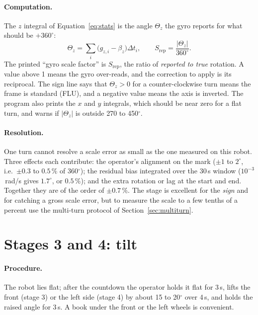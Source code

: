 \documentclass[11pt,a4paper]{report}
\begin{document}
\paragraph{Computation.} The $z$ integral of Equation~\eqref{eq:stats} is the angle $\Theta_z$ the gyro reports for what should be $+360^\circ$:
\begin{equation}
  \Theta_z=\sum_i\bigl(g_{z,i}-\beta_z\bigr)\Delta t_i,\qquad S_{\mathrm{rep}}=\frac{|\Theta_z|}{360^\circ}. \label{eq:s2scale}
\end{equation}
The printed ``gyro scale factor'' is $S_{\mathrm{rep}}$, the ratio of \emph{reported to true} rotation. A value above 1 means the gyro over-reads, and the correction to apply is its reciprocal. The sign line says that $\Theta_z>0$ for a counter-clockwise turn means the frame is standard (FLU), and a negative value means the axis is inverted. The program also prints the $x$ and $y$ integrals, which should be near zero for a flat turn, and warns if $|\Theta_z|$ is outside 270 to 450$^\circ$.

\paragraph{Resolution.} One turn cannot resolve a scale error as small as the one measured on this robot. Three effects each contribute: the operator's alignment on the mark ($\pm1$ to $2^\circ$, i.e.\ $\pm0.3$ to $0.5\,\%$ of 360$^\circ$); the residual bias integrated over the 30\,s window ($10^{-3}$\,rad/s gives $1.7^\circ$, or $0.5\,\%$); and the extra rotation or lag at the start and end. Together they are of the order of $\pm0.7\,\%$. The stage is excellent for the \emph{sign} and for catching a gross scale error, but to measure the scale to a few tenths of a percent use the multi-turn protocol of Section~\ref{sec:multiturn}.

\section{Stages 3 and 4: tilt}
\paragraph{Procedure.} The robot lies flat; after the countdown the operator holds it flat for 3\,s, lifts the front (stage 3) or the left side (stage 4) by about 15 to 20$^\circ$ over 4\,s, and holds the raised angle for 3\,s. A book under the front or the left wheels is convenient.
\end{document}
